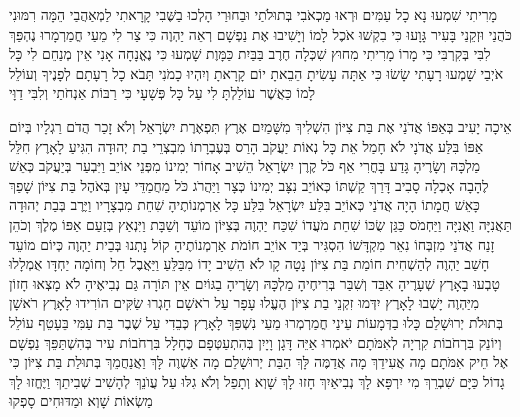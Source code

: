 \documentclass[../main/main.tex]{subfiles}
\begin{document}
\begin{multicols}{\ncols}
מָרִיתִי שִׁמְעוּ נָא כָל עַמִּים וּרְאוּ מַכְאֹבִי בְּתוּלֹתַי וּבַחוּרַי הָלְכוּ בַשֶּׁבִי \ClosedSection{}קָרָאתִי לַמְאַהֲבַי הֵמָּה רִמּוּנִי כֹּהֲנַי וּזְקֵנַי בָּעִיר גָּוָעוּ כִּי בִקְשׁוּ אֹכֶל לָמוֹ וְיָשִׁיבוּ אֶת נַפְשָׁם \ClosedSection{}רְאֵה יַהְוֶה כִּי צַר לִי מֵעַי חֳמַרְמָרוּ נֶהְפַּךְ לִבִּי בְּקִרְבִּי כִּי מָרוֹ מָרִיתִי מִחוּץ שִׁכְּלָה חֶרֶב בַּבַּיִת כַּמָּוֶת \ClosedSection{}שָׁמְעוּ כִּי נֶאֱנָחָה אָנִי אֵין מְנַחֵם לִי כָּל אֹיְבַי שָׁמְעוּ רָעָתִי שָׂשׂוּ כִּי אַתָּה עָשִׂיתָ הֵבֵאתָ יוֹם קָרָאתָ וְיִהְיוּ כָמֹנִי \ClosedSection{}תָּבֹא כָל רָעָתָם לְפָנֶיךָ וְעוֹלֵל לָמוֹ כַּאֲשֶׁר עוֹלַלְתָּ לִי עַל כָּל פְּשָׁעָי כִּי רַבּוֹת אַנְחֹתַי וְלִבִּי דַוָּי\OpenSection{}\par
{}אֵיכָה יָעִיב בְּאַפּוֹ אֲדֹנַי אֶת בַּת צִיּוֹן הִשְׁלִיךְ מִשָּׁמַיִם אֶרֶץ תִּפְאֶרֶת יִשְׂרָאֵל וְלֹא זָכַר הֲדֹם רַגְלָיו בְּיוֹם אַפּוֹ \ClosedSection{}בִּלַּע אֲדֹנָי לֹא חָמַל אֵת כָּל נְאוֹת יַעֲקֹב הָרַס בְּעֶבְרָתוֹ מִבְצְרֵי בַת יְהוּדָה הִגִּיעַ לָאָרֶץ חִלֵּל מַלְכָּהּ\SubEnd{} וְשָׂרֶיהָ \ClosedSection{}גָּדַע בָּחֳרִי אַף כֹּל קֶרֶן יִשְׂרָאֵל הֵשִׁיב אָחוֹר יְמִינוֹ מִפְּנֵי אוֹיֵב וַיִּבְעַר בְּיַעֲקֹב כְּאֵשׁ לֶהָבָה אָכְלָה סָבִיב \ClosedSection{}דָּרַךְ קַשְׁתּוֹ כְּאוֹיֵב נִצָּב יְמִינוֹ כְּצָר וַיַּהֲרֹג כֹּל מַחֲמַדֵּי עָיִן בְּאֹהֶל בַּת צִיּוֹן שָׁפַךְ כָּאֵשׁ חֲמָתוֹ \ClosedSection{}הָיָה אֲדֹנַי כְּאוֹיֵב בִּלַּע יִשְׂרָאֵל בִּלַּע כָּל אַרְמְנוֹתֶיהָ שִׁחֵת מִבְצָרָיו וַיֶּרֶב בְּבַת יְהוּדָה תַּאֲנִיָּה וַאֲנִיָּה \ClosedSection{}וַיַּחְמֹס כַּגַּן שֻׂכּוֹ שִׁחֵת מֹעֲדוֹ שִׁכַּח יַהְוֶה בְּצִיּוֹן מוֹעֵד וְשַׁבָּת וַיִּנְאַץ בְּזַעַם אַפּוֹ מֶלֶךְ וְכֹהֵן \ClosedSection{}זָנַח אֲדֹנַי מִזְבְּחוֹ נִאֵר מִקְדָּשׁוֹ הִסְגִּיר בְּיַד אוֹיֵב חוֹמֹת אַרְמְנוֹתֶיהָ קוֹל נָתְנוּ בְּבֵית יַהְוֶה כְּיוֹם מוֹעֵד \ClosedSection{}חָשַׁב יַהְוֶה לְהַשְׁחִית חוֹמַת בַּת צִיּוֹן נָטָה קָו לֹא הֵשִׁיב יָדוֹ מִבַּלֵּעַ וַיַּאֲבֶל חֵל וְחוֹמָה יַחְדָּו אֻמְלָלוּ \ClosedSection{}טָבְעוּ בָאָרֶץ שְׁעָרֶיהָ אִבַּד וְשִׁבַּר בְּרִיחֶיהָ מַלְכָּהּ וְשָׂרֶיהָ בַגּוֹיִם אֵין תּוֹרָה גַּם נְבִיאֶיהָ לֹא מָצְאוּ חָזוֹן מִיַּהְוֶה \ClosedSection{}יָשְׁבוּ\SubEnd{} לָאָרֶץ יִדְּמוּ זִקְנֵי בַת צִיּוֹן הֶעֱלוּ עָפָר עַל רֹאשָׁם חָגְרוּ שַׂקִּים הוֹרִידוּ לָאָרֶץ רֹאשָׁן בְּתוּלֹת יְרוּשָׁלֵם \ClosedSection{}כָּלוּ בַדְּמָעוֹת עֵינַי חֳמַרְמְרוּ מֵעַי נִשְׁפַּךְ לָאָרֶץ כְּבֵדִי עַל שֶׁבֶר בַּת עַמִּי בֵּעָטֵף עוֹלֵל וְיוֹנֵק בִּרְחֹבוֹת קִרְיָה \ClosedSection{}לְאִמֹּתָם יֹאמְרוּ אַיֵּה דָּגָן וָיָיִן בְּהִתְעַטְּפָם כֶּחָלָל בִּרְחֹבוֹת עִיר בְּהִשְׁתַּפֵּךְ נַפְשָׁם אֶל חֵיק אִמֹּתָם \ClosedSection{}מָה אֲעִידֵךְ מָה אֲדַמֶּה לָּךְ הַבַּת יְרוּשָׁלֵם מָה אַשְׁוֶה לָּךְ וַאֲנַחֲמֵךְ בְּתוּלַת בַּת צִיּוֹן כִּי גָדוֹל כַּיָּם שִׁבְרֵךְ מִי יִרְפָּא לָךְ \ClosedSection{}נְבִיאַיִךְ חָזוּ לָךְ שָׁוְא וְתָפֵל וְלֹא גִלּוּ עַל עֲוֺנֵךְ לְהָשִׁיב שְׁבִיתֵךְ וַיֶּחֱזוּ לָךְ מַשְׂאוֹת שָׁוְא וּמַדּוּחִים \ClosedSection{}סָפְקוּ 
\end{multicols}
\end{document}
